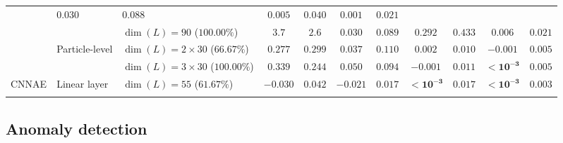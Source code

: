 \begin{table}[ht!]
{\begin{tabular}{lllcccccccc}
         & $\mathit{0.030}$ & $\mathit{0.088}$
         & $\mathit{0.005}$ & $\mathit{0.040}$
         & $\mathit{0.001}$ & ${0.021}$
        \\
         & & $\dim(L) = 90$ ($100.00\%$)
         & ${3.7}$ & $2.6$
         & $\mathit{0.030}$ & ${0.089}$
         & ${0.292}$ & ${0.433}$
         & ${0.006}$ & ${0.021}$
        \\[1mm]
         & \multirow{2}{*}{Particle-level}
         & $\dim(L) = 2 \times 30$ ($66.67\%$)
         & $\mathit{0.277}$ & ${0.299}$
         & $\mathit{0.037}$ & ${0.110}$
         & ${0.002}$ & $\mathit{0.010}$
         & $-0.001$ & ${0.005}$
        \\
         & & $\dim(L) = 3 \times 30$ ($100.00\%$)
         & ${0.339}$ & $\mathit{0.244}$
         & ${0.050}$ & $\mathit{0.094}$
         & $\mathit{-0.001}$ & ${0.011}$
         & $\mathbf{<10^{-3}}$ & ${0.005}$
        \\[2mm]
        CNNAE
        & Linear layer
        & $\dim(L) = 55$ ($61.67\%$)
        & $-0.030$
        & $0.042$
        & $-0.021$
        & $0.017$
        & $\mathbf{< 10^{-3}}$
        & $0.017$
        & $\mathbf{<10^{-3}}$
        & $0.003$ \\
        \cbottomrule
    \end{tabular}
    }
\end{table}

\clearpage
\subsection{Anomaly detection}
\label{sec:06_lgae_anomaly}

